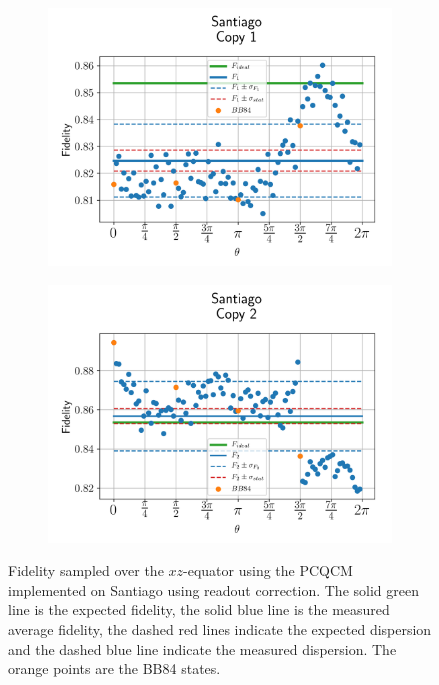 \begin{figure}[H]
  \centering
  \begin{subfigure}{.5\textwidth}
    \centering
    \includegraphics[width=\textwidth]{Figures/PhaseCovariant/IBM/OnlyEquator/results_corrected_santiago_copy1.png}
    \label{fig:pc_corrected_santiago_equator_1}
  \end{subfigure}%
  \begin{subfigure}{.5\textwidth}
    \centering
    \includegraphics[width=\textwidth]{Figures/PhaseCovariant/IBM/OnlyEquator/results_corrected_santiago_copy2.png}
    \label{fig:pc_corrected_santiago_equator_2}
  \end{subfigure}
  \vspace{-0.5cm}
  \caption{Fidelity sampled over the $xz$-equator using the PCQCM implemented on Santiago using readout correction. The solid green line is the expected fidelity, the solid blue line is the measured average fidelity, the dashed red lines indicate the expected dispersion and the dashed blue line indicate the measured dispersion. The orange points are the BB84 states.}
  \label{fig:pc_corrected_santiago_equator}
\end{figure}


